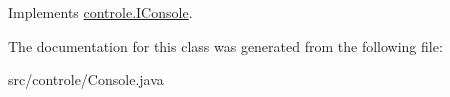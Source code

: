 Implements \hyperlink{interfacecontrole_1_1_i_console_ab6728a4bf807f04e5d13bfd452a69bc2}{controle.\-I\-Console}.



The documentation for this class was generated from the following file\-:\begin{DoxyCompactItemize}
\item 
src/controle/Console.\-java\end{DoxyCompactItemize}
